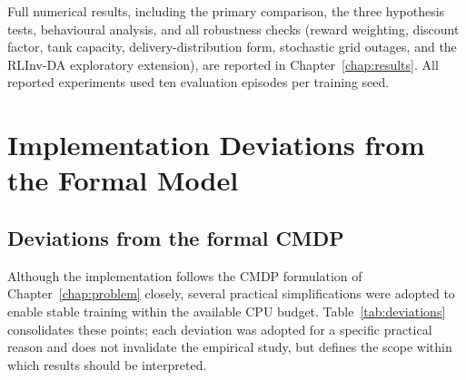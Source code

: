 Full numerical results, including the primary comparison, the three
hypothesis tests, behavioural analysis, and all robustness checks
(reward weighting, discount factor, tank capacity, delivery-distribution
form, stochastic grid outages, and the RLInv-DA exploratory extension),
are reported in Chapter~\ref{chap:results}. All reported
experiments used ten evaluation episodes per training seed.


\section{Implementation Deviations from the Formal Model}
\label{sec:impl_deviations}

\subsection{Deviations from the formal CMDP}
\label{sec:deviations_table}

Although the implementation follows the CMDP formulation of
Chapter~\ref{chap:problem} closely, several practical simplifications
were adopted to enable stable training within the available CPU budget.
Table~\ref{tab:deviations} consolidates these points; each deviation was
adopted for a specific practical reason and does not invalidate the
empirical study, but defines the scope within which results should be
interpreted.

